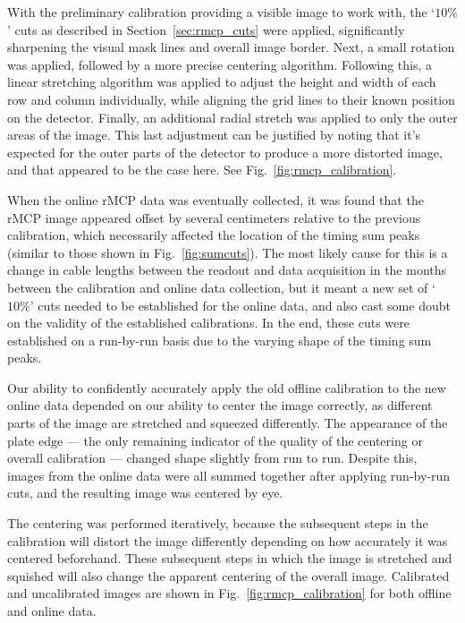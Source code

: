 With the preliminary calibration providing a visible image to work with, the `$10\%$' cuts as described in Section~\ref{sec:rmcp_cuts} were applied, significantly sharpening the visual mask lines and overall image border. Next, a small rotation was applied, followed by a more precise centering algorithm. Following this, a linear stretching algorithm was applied to adjust the height and width of each row and column individually, while aligning the grid lines to their known position on the detector.  Finally, an additional radial stretch was applied to only the outer areas of the image.  This last adjustment can be justified by noting that it's expected for the outer parts of the detector to produce a more distorted image, and that appeared to be the case here.  See Fig.~\ref{fig:rmcp_calibration}.

When the online rMCP data was eventually collected, it was found that the rMCP image appeared offset by several centimeters relative to the previous calibration, which necessarily affected the location of the timing sum peaks (similar to those shown in Fig.~\ref{fig:sumcuts}).  The most likely cause for this is a change in cable lengths between the readout and data acquisition in the months between the calibration and online data collection, but it meant a new set of `$10\%$' cuts needed to be established for the online data, and also cast some doubt on the validity of the established calibrations.  In the end, these cuts were established on a run-by-run basis due to the varying shape of the timing sum peaks.  

Our ability to confidently accurately apply the old offline calibration to the new online data depended on our ability to center the image correctly, as different parts of the image are stretched and squeezed differently.  The appearance of the plate $\mbox{edge ---}$ the only remaining indicator of the quality of the centering or overall calibration --- changed shape slightly from run to run.  Despite this, images from the online data were all summed together after applying run-by-run cuts, and the resulting image was centered by eye.  

The centering was performed iteratively, because the subsequent steps in the calibration will distort the image differently depending on how accurately it was centered beforehand.  These subsequent steps in which the image is stretched and squished will also change the apparent centering of the overall image.  Calibrated and uncalibrated images are shown in Fig.~\ref{fig:rmcp_calibration} for both offline and online data.

